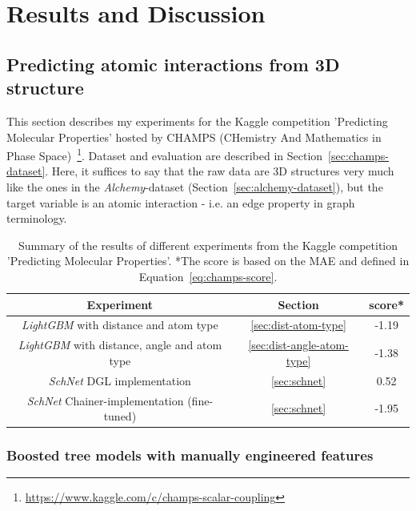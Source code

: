 \chapter{Results and Discussion}
\label{chapter:Results}

\section{Predicting atomic interactions from 3D structure}
\label{sec:champs}

This section describes my experiments for the Kaggle competition 'Predicting Molecular Properties' hosted by CHAMPS (CHemistry And Mathematics in Phase Space)~\footnote{\url{https://www.kaggle.com/c/champs-scalar-coupling}}.
Dataset and evaluation are described in Section~\ref{sec:champs-dataset}. Here, it suffices to say that the raw data are 3D structures very much like the ones in the \textit{Alchemy}-dataset (Section~\ref{sec:alchemy-dataset}), but the target variable is an atomic interaction - i.e. an edge property in graph terminology.


\begin{table}[H]
\begin{centering}
	\begin{tabular}{||c | c | c||} 
		\hline
		\textbf{Experiment} & \textbf{Section} & \textbf{score*} \\ [0.5ex] 
		\hline\hline
		\textit{LightGBM} with distance and atom type & \ref{sec:dist-atom-type} & -1.19 \\ 
		\textit{LightGBM} with distance, angle and atom type & \ref{sec:dist-angle-atom-type} & -1.38 \\
		\textit{SchNet} DGL implementation & \ref{sec:schnet} & 0.52  \\
		\textit{SchNet} Chainer-implementation (fine-tuned) & \ref{sec:schnet} & -1.95 \\ [1ex] 
		\hline
	\end{tabular}
	\vspace{0.5cm}
	\caption{Summary of the results of different experiments from the Kaggle competition 'Predicting Molecular Properties'. *The score is based on the MAE and defined in Equation~\ref{eq:champs-score}.}
	\label{tab:champs-results}
\end{centering}
\end{table}


\subsection{Boosted tree models with manually engineered features}
\label{sec:champs-boosted-tree}

